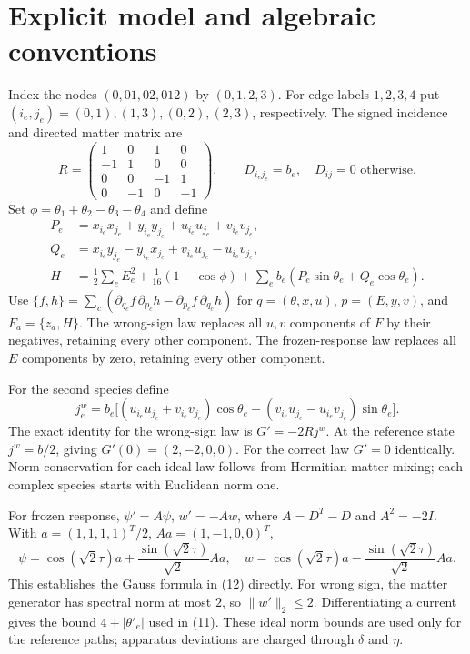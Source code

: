 \documentclass[10pt,a4paper]{article}
\begin{document}
\section{Explicit model and algebraic conventions}
Index the nodes $(0,01,02,012)$ by $(0,1,2,3)$. For edge labels $1,2,3,4$ put $(i_e,j_e)=(0,1),(1,3),(0,2),(2,3)$, respectively. The signed incidence and directed matter matrix are
\begin{equation}
R=\begin{pmatrix}1&0&1&0\\-1&1&0&0\\0&0&-1&1\\0&-1&0&-1\end{pmatrix},
\qquad D_{i_ej_e}=b_e,\quad D_{ij}=0\text{ otherwise}.
\end{equation}
Set $\phi=\theta_1+\theta_2-\theta_3-\theta_4$ and define
\begin{equation}
\begin{split}
P_e&=x_{i_e}x_{j_e}+y_{i_e}y_{j_e}
       +u_{i_e}u_{j_e}+v_{i_e}v_{j_e},\\
Q_e&=x_{i_e}y_{j_e}-y_{i_e}x_{j_e}
       +v_{i_e}u_{j_e}-u_{i_e}v_{j_e},\\
H&=\tfrac12\sum_e E_e^2+\tfrac1{16}(1-\cos\phi)
       +\sum_e b_e(P_e\sin\theta_e+Q_e\cos\theta_e).
\end{split}
\end{equation}
Use $\{f,h\}=\sum_c(\partial_{q_c}f\,\partial_{p_c}h-
\partial_{p_c}f\,\partial_{q_c}h)$ for $q=(\theta,x,u)$, $p=(E,y,v)$, and $F_a=\{z_a,H\}$. The wrong-sign law replaces all $u,v$ components of $F$ by their negatives, retaining every other component. The frozen-response law replaces all $E$ components by zero, retaining every other component.

For the second species define
\begin{equation}
j^w_e=b_e\big[(u_{i_e}u_{j_e}+v_{i_e}v_{j_e})\cos\theta_e
 -(v_{i_e}u_{j_e}-u_{i_e}v_{j_e})\sin\theta_e\big].
\end{equation}
The exact identity for the wrong-sign law is $G'=-2Rj^w$. At the reference state $j^w=b/2$, giving $G'(0)=(2,-2,0,0)$. For the correct law $G'=0$ identically. Norm conservation for each ideal law follows from Hermitian matter mixing; each complex species starts with Euclidean norm one.

For frozen response, $\psi'=A\psi$, $w'=-Aw$, where $A=D^T-D$ and $A^2=-2I$. With $a=(1,1,1,1)^T/2$, $Aa=(1,-1,0,0)^T$,
\begin{equation}
\psi=\cos(\sqrt2\tau)a+\frac{\sin(\sqrt2\tau)}{\sqrt2}Aa,\quad
w=\cos(\sqrt2\tau)a-\frac{\sin(\sqrt2\tau)}{\sqrt2}Aa .
\end{equation}
This establishes the Gauss formula in (12) directly. For wrong sign, the matter generator has spectral norm at most $2$, so $\|w'\|_2\leq2$. Differentiating a current gives the bound $4+|\theta'_e|$ used in (11). These ideal norm bounds are used only for the reference paths; apparatus deviations are charged through $\delta$ and $\eta$.
\end{document}
